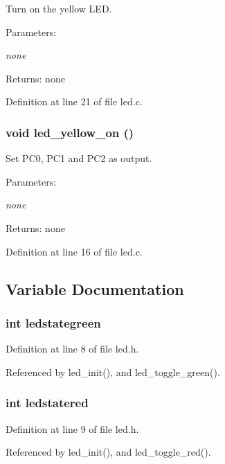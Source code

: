 Turn on the yellow LED. 

\begin{Desc}
\item[Parameters:]
\begin{description}
\item[{\em none}]\end{description}
\end{Desc}
\begin{Desc}
\item[Returns:]none \end{Desc}


Definition at line 21 of file led.c.
\subsubsection{\setlength{\rightskip}{0pt plus 5cm}void led\_\-yellow\_\-on ()}\label{led_8h_343d41d3b6e13512551ca21bf3ed1881}


Set PC0, PC1 and PC2 as output. 

\begin{Desc}
\item[Parameters:]
\begin{description}
\item[{\em none}]\end{description}
\end{Desc}
\begin{Desc}
\item[Returns:]none \end{Desc}


Definition at line 16 of file led.c.

\subsection{Variable Documentation}
\subsubsection{\setlength{\rightskip}{0pt plus 5cm}int {\bf ledstategreen}}\label{led_8h_7ec5d3368257be6ee531a2572de34f67}




Definition at line 8 of file led.h.

Referenced by led\_\-init(), and led\_\-toggle\_\-green().
\subsubsection{\setlength{\rightskip}{0pt plus 5cm}int {\bf ledstatered}}\label{led_8h_72bc5a873b368bcf213e852c64819647}




Definition at line 9 of file led.h.

Referenced by led\_\-init(), and led\_\-toggle\_\-red().